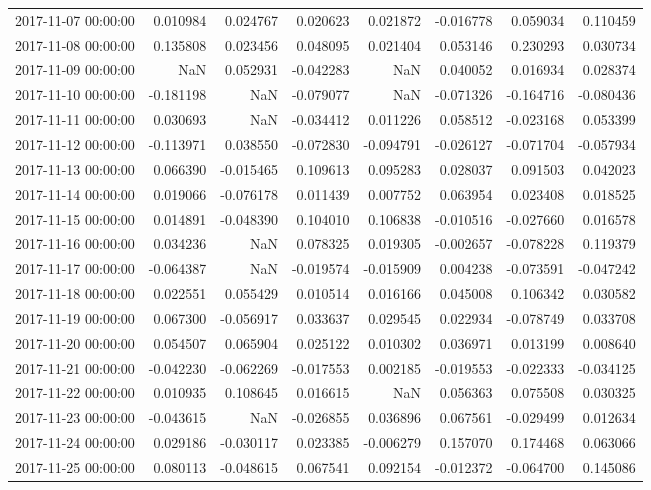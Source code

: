 \begin{tabular}{lrrrrrrr}
2017-11-07 00:00:00 & 0.010984 & 0.024767 & 0.020623 & 0.021872 & -0.016778 & 0.059034 & 0.110459 \\
2017-11-08 00:00:00 & 0.135808 & 0.023456 & 0.048095 & 0.021404 & 0.053146 & 0.230293 & 0.030734 \\
2017-11-09 00:00:00 & NaN & 0.052931 & -0.042283 & NaN & 0.040052 & 0.016934 & 0.028374 \\
2017-11-10 00:00:00 & -0.181198 & NaN & -0.079077 & NaN & -0.071326 & -0.164716 & -0.080436 \\
2017-11-11 00:00:00 & 0.030693 & NaN & -0.034412 & 0.011226 & 0.058512 & -0.023168 & 0.053399 \\
2017-11-12 00:00:00 & -0.113971 & 0.038550 & -0.072830 & -0.094791 & -0.026127 & -0.071704 & -0.057934 \\
2017-11-13 00:00:00 & 0.066390 & -0.015465 & 0.109613 & 0.095283 & 0.028037 & 0.091503 & 0.042023 \\
2017-11-14 00:00:00 & 0.019066 & -0.076178 & 0.011439 & 0.007752 & 0.063954 & 0.023408 & 0.018525 \\
2017-11-15 00:00:00 & 0.014891 & -0.048390 & 0.104010 & 0.106838 & -0.010516 & -0.027660 & 0.016578 \\
2017-11-16 00:00:00 & 0.034236 & NaN & 0.078325 & 0.019305 & -0.002657 & -0.078228 & 0.119379 \\
2017-11-17 00:00:00 & -0.064387 & NaN & -0.019574 & -0.015909 & 0.004238 & -0.073591 & -0.047242 \\
2017-11-18 00:00:00 & 0.022551 & 0.055429 & 0.010514 & 0.016166 & 0.045008 & 0.106342 & 0.030582 \\
2017-11-19 00:00:00 & 0.067300 & -0.056917 & 0.033637 & 0.029545 & 0.022934 & -0.078749 & 0.033708 \\
2017-11-20 00:00:00 & 0.054507 & 0.065904 & 0.025122 & 0.010302 & 0.036971 & 0.013199 & 0.008640 \\
2017-11-21 00:00:00 & -0.042230 & -0.062269 & -0.017553 & 0.002185 & -0.019553 & -0.022333 & -0.034125 \\
2017-11-22 00:00:00 & 0.010935 & 0.108645 & 0.016615 & NaN & 0.056363 & 0.075508 & 0.030325 \\
2017-11-23 00:00:00 & -0.043615 & NaN & -0.026855 & 0.036896 & 0.067561 & -0.029499 & 0.012634 \\
2017-11-24 00:00:00 & 0.029186 & -0.030117 & 0.023385 & -0.006279 & 0.157070 & 0.174468 & 0.063066 \\
2017-11-25 00:00:00 & 0.080113 & -0.048615 & 0.067541 & 0.092154 & -0.012372 & -0.064700 & 0.145086 \\

\end{tabular}

